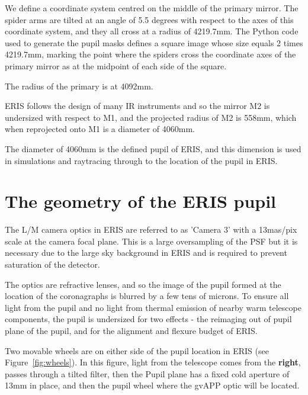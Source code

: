\documentclass[a4paper,11pt]{article}
\begin{document}
We define a coordinate system centred on the middle of the primary mirror. The
spider arms are tilted at an angle of 5.5 degrees with respect to the axes of
this coordinate system, and they all cross at a radius of 4219.7mm. The Python
code used to generate the pupil masks defines a square image whose size equals
2 times 4219.7mm, marking the point where the spiders cross the coordinate axes
of the primary mirror as at the midpoint of each side of the square.

The radius of the primary is at 4092mm.

ERIS follows the design of many IR instruments and so the mirror M2 is
undersized with respect to M1, and the projected radius of M2 is 558mm, which
when reprojected onto M1 is a diameter of 4060mm.

The diameter of 4060mm is the defined pupil of ERIS, and this dimension is used
in simulations and raytracing through to the location of the pupil in ERIS.

\section{The geometry of the ERIS pupil}

The L/M camera optics in ERIS are referred to as 'Camera 3' with a 13mas/pix
scale at the camera focal plane. This is a large oversampling of the PSF but it
is necessary due to the large sky background in ERIS and is required to prevent
saturation of the detector.

The optics are refractive lenses, and so the image of the pupil formed at the
location of the coronagraphs is blurred by a few tens of microns. To ensure all
light from the pupil and no light from thermal emission of nearby warm
telescope components, the pupil is undersized for two effects - the reimaging
out of pupil plane of the pupil, and for the alignment and flexure budget of
ERIS.

Two movable wheels are on either side of the pupil location in ERIS (see
Figure~\ref{fig:wheels}). In this figure, light from the
telescope comes from the {\bf right}, passes through a tilted filter, then the Pupil
plane has a fixed cold aperture of 13mm in place, and then the pupil wheel
where the gvAPP optic will be located.
\end{document}
